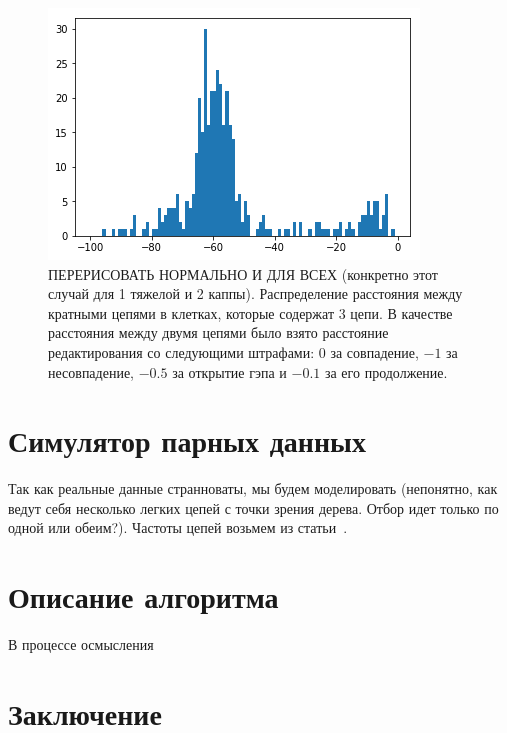 \documentclass{spbau-diploma}
\begin{document}
 
 \begin{figure}[h!]
    \centering
    \includegraphics[width=.9\textwidth]{figures/HKK_hist.png}
    \caption{ПЕРЕРИСОВАТЬ НОРМАЛЬНО И ДЛЯ ВСЕХ (конкретно этот случай для 1 тяжелой и 2 каппы). Распределение расстояния между кратными цепями в клетках, которые содержат $3$ цепи.  В качестве расстояния между двумя цепями было взято расстояние редактирования со следующими штрафами: $0$ за совпадение, $-1$ за несовпадение, $-0.5$ за открытие гэпа и $-0.1$ за его продолжение.}
    \label{chains_hist}
\end{figure}

   










\section{Симулятор парных данных}

Так как реальные данные странноваты, мы будем моделировать (непонятно, как ведут себя несколько легких цепей с точки зрения дерева. Отбор идет только по одной или обеим?). Частоты цепей возьмем из статьи~\cite{dekosky2015depth}. 



\section{Описание алгоритма}

В процессе осмысления



\section*{Заключение}



\end{document}
